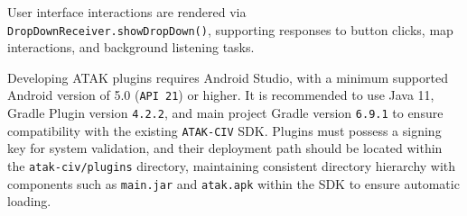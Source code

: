 User interface interactions are rendered via \\\texttt{DropDownReceiver.showDropDown()}, supporting responses to button clicks, map interactions, and background listening tasks.

\vspace{0.5em}
Developing ATAK plugins requires Android Studio, with a minimum supported Android version of 5.0 (\texttt{API 21}) or higher. It is recommended to use Java 11, Gradle Plugin version \texttt{4.2.2}, and main project Gradle version \texttt{6.9.1} to ensure compatibility with the existing \texttt{ATAK-CIV} SDK. Plugins must possess a signing key for system validation, and their deployment path should be located within the \texttt{atak-civ/plugins} directory, maintaining consistent directory hierarchy with components such as \texttt{main.jar} and \texttt{atak.apk} within the SDK to ensure automatic loading.

